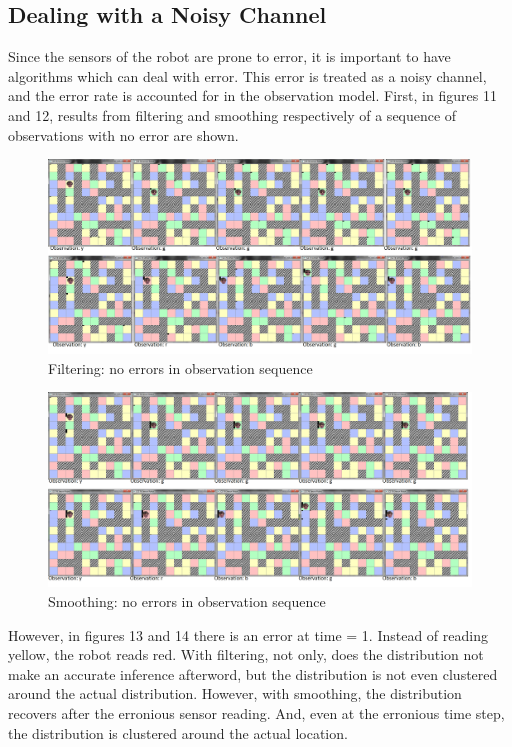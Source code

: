 \documentclass[a4paper]{article}
\begin{document}
\subsection{Dealing with a Noisy Channel}

Since the sensors of the robot are prone to error, it is important to have algorithms which can deal with error. This error is treated as a noisy channel, and the error rate is accounted for in the observation model. First, in figures 11 and 12, results from filtering and smoothing respectively of a sequence of observations with no error are shown.

\begin{figure}[H]
\centering
\includegraphics[width=1.2\textwidth]{4x4WallMazeFiltering_no_mistake.png}
\caption{\label{fig:2x2 maze}Filtering: no errors in observation sequence}
\end{figure}

\begin{figure}[H]
\centering
\includegraphics[width=1.2\textwidth]{4x4WallMazeSmoothing_no_mistake.png}
\caption{\label{fig:2x2 maze}Smoothing: no errors in observation sequence}
\end{figure}

However, in figures 13 and 14 there is an error at time = 1. Instead of reading yellow, the robot reads red. With filtering, not only, does the distribution not make an accurate inference afterword, but the distribution is not even clustered around the actual distribution. However, with smoothing, the distribution recovers after the erronious sensor reading. And, even at the erronious time step, the distribution is clustered around the actual location.
\end{document}
